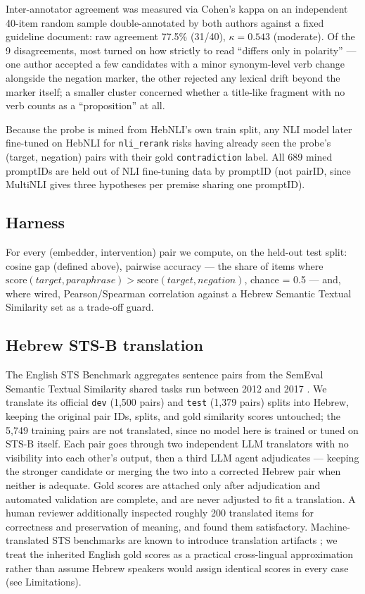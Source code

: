 \documentclass{article}
\begin{document}
Inter-annotator agreement was measured via Cohen's kappa on an independent
40-item random sample double-annotated by both authors against a fixed
guideline document: raw agreement 77.5\% (31/40), $\kappa = 0.543$
(moderate). Of the 9 disagreements, most turned on how strictly to read
``differs only in polarity'' --- one author accepted a few candidates with a
minor synonym-level verb change alongside the negation marker, the other
rejected any lexical drift beyond the marker itself; a smaller cluster
concerned whether a title-like fragment with no verb counts as a
``proposition'' at all.

Because the probe is mined from HebNLI's own train split, any NLI model
later fine-tuned on HebNLI for \texttt{nli\_rerank} risks having already
seen the probe's (target, negation) pairs with their gold
\texttt{contradiction} label. All 689 mined promptIDs are held out of NLI
fine-tuning data by promptID (not pairID, since MultiNLI gives three
hypotheses per premise sharing one promptID).

\subsection{Harness}

For every (embedder, intervention) pair we compute, on the held-out test
split: cosine gap (defined above), pairwise accuracy --- the share of
items where $\mathrm{score}(\mathit{target}, \mathit{paraphrase}) >
\mathrm{score}(\mathit{target}, \mathit{negation})$, chance = 0.5 --- and,
where wired, Pearson/Spearman correlation against a Hebrew Semantic
Textual Similarity set as a trade-off guard.

\subsection{Hebrew STS-B translation}

The English STS Benchmark aggregates sentence pairs from the SemEval
Semantic Textual Similarity shared tasks run between 2012 and 2017
\citep{agirre2017semeval}. We translate its official \texttt{dev}
(1{,}500 pairs) and \texttt{test} (1{,}379 pairs) splits into Hebrew,
keeping the original pair IDs, splits, and gold similarity scores
untouched; the 5{,}749 training pairs are not translated, since no model
here is trained or tuned on STS-B itself. Each pair goes through two
independent LLM translators with no visibility into each other's output,
then a third LLM agent adjudicates --- keeping the stronger candidate or
merging the two into a corrected Hebrew pair when neither is adequate.
Gold scores are attached only after adjudication and automated validation
are complete, and are never adjusted to fit a translation. A human reviewer
additionally inspected roughly 200 translated items for correctness and
preservation of meaning, and found them satisfactory. Machine-translated
STS benchmarks are known to introduce translation artifacts
\citep{isbister2020swedish}; we treat the inherited English gold scores as
a practical cross-lingual approximation rather than assume Hebrew speakers
would assign identical scores in every case (see Limitations).
\end{document}
